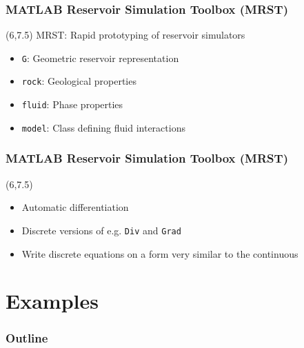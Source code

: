 \documentclass[screen, aspectratio=43]{beamer}
\begin{document}
{
\begin{frame}
  \frametitle{MATLAB Reservoir Simulation Toolbox (MRST)}
  
  \begin{textblock}{10}(6,7.5)
    MRST: Rapid prototyping of reservoir simulators \cite{krogstad2015mrst}
    \begin{itemize}
    \item \texttt{G}: Geometric reservoir representation
    \item \texttt{rock}: Geological properties
    \item \texttt{fluid}: Phase properties
    \item \texttt{model}: Class defining fluid interactions
    \end{itemize}
  \end{textblock}

\end{frame}
}

{
\begin{frame}
  
 \frametitle{MATLAB Reservoir Simulation Toolbox (MRST)}

  \begin{textblock}{10}(6,7.5)
    \begin{itemize}
    \item Automatic differentiation
    \item Discrete versions of e.g. \texttt{Div} and \texttt{Grad}
    \item Write discrete equations on a form very similar to the continuous
    \end{itemize}
  \end{textblock}
    
\end{frame}
}


\section{Examples}

\begin{frame}
  \frametitle{Outline}
  \tableofcontents[currentsection]
\end{frame}
\end{document}
